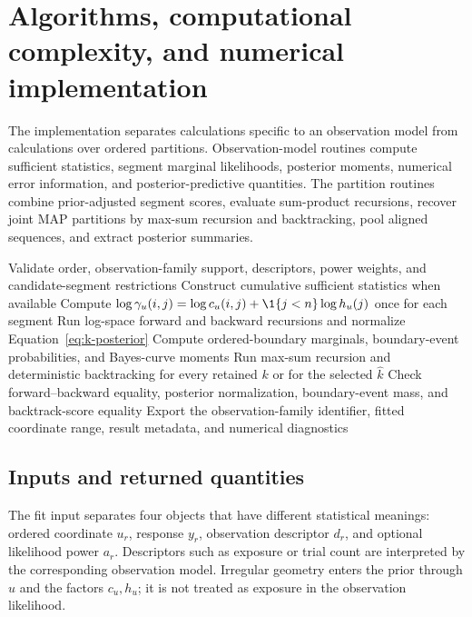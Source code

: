 \section{Algorithms, computational complexity, and numerical implementation}
\label{sec:algorithms}

The implementation separates calculations specific to an observation model from calculations over ordered partitions. Observation-model routines compute sufficient statistics, segment marginal likelihoods, posterior moments, numerical error information, and posterior-predictive quantities. The partition routines combine prior-adjusted segment scores, evaluate sum-product recursions, recover joint MAP partitions by max-sum recursion and backtracking, pool aligned sequences, and extract posterior summaries.

\begin{algorithm*}[t]
\caption{\BayesBreak offline fit}
\label{alg:bayesbreak-fit-paper}
Validate order, observation-family support, descriptors, power weights, and candidate-segment restrictions\;
Construct cumulative sufficient statistics when available\;
\For{each admissible segment $(i,j]$}{
  compute $\log A^{(0)}_{ij}$ and the required moments or posterior state\;
  record validity, convergence, and approximation diagnostics\;
  assign score $-\infty$ to an inadmissible segment rather than substituting a finite value from another model\;
}
Compute $\log\gamma_u(i,j)=\log c_u(i,j)+\1\{j<n\}\log h_u(j)$ once for each segment\;
Run log-space forward and backward recursions and normalize Equation~\eqref{eq:k-posterior}\;
Compute ordered-boundary marginals, boundary-event probabilities, and Bayes-curve moments\;
Run max-sum recursion and deterministic backtracking for every retained $k$ or for the selected $\widehat k$\;
Check forward--backward equality, posterior normalization, boundary-event mass, and backtrack-score equality\;
Export the observation-family identifier, fitted coordinate range, result metadata, and numerical diagnostics\;
\end{algorithm*}

\subsection{Inputs and returned quantities}
The fit input separates four objects that have different statistical meanings: ordered coordinate $u_r$, response $y_r$, observation descriptor $d_r$, and optional likelihood power $a_r$. Descriptors such as exposure or trial count are interpreted by the corresponding observation model. Irregular geometry enters the prior through $u$ and the factors $c_u,h_u$; it is not treated as exposure in the observation likelihood.

